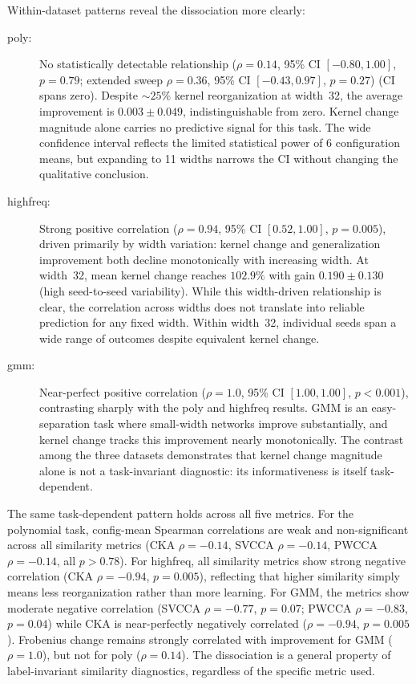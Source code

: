 \documentclass[twoside,11pt]{article}
\begin{document}
Within-dataset patterns reveal the dissociation more clearly:
\begin{description}
        \item[poly:] No statistically detectable relationship ($\rho=0.14$, 95\% CI ${[-0.80, 1.00]}$, $p=0.79$; extended sweep $\rho=0.36$, 95\% CI ${[-0.43, 0.97]}$, $p=0.27$) (CI spans zero).  Despite $\sim25\%$ kernel reorganization at width~32, the average improvement is $0.003\pm0.049$, indistinguishable from zero.  Kernel change magnitude alone carries no predictive signal for this task. The wide confidence interval reflects the limited statistical power of 6 configuration means, but expanding to 11 widths narrows the CI without changing the qualitative conclusion.
    \item[highfreq:] Strong positive correlation ($\rho=0.94$, 95\% CI ${[0.52, 1.00]}$, $p=0.005$), driven primarily by width variation: kernel change and generalization improvement both decline monotonically with increasing width.  At width~32, mean kernel change reaches $102.9\%$ with gain $0.190\pm0.130$ (high seed-to-seed variability).  While this width-driven relationship is clear, the correlation across widths does not translate into reliable prediction for any fixed width. Within width~32, individual seeds span a wide range of outcomes despite equivalent kernel change.
    \item[gmm:] Near-perfect positive correlation ($\rho=1.0$, 95\% CI ${[1.00, 1.00]}$, $p<0.001$), contrasting sharply with the poly and highfreq results.  GMM is an easy-separation task where small-width networks improve substantially, and kernel change tracks this improvement nearly monotonically.  The contrast among the three datasets demonstrates that kernel change magnitude alone is not a task-invariant diagnostic: its informativeness is itself task-dependent.

\end{description}

The same task-dependent pattern holds across all five metrics. For the polynomial task, config-mean Spearman correlations are weak and non-significant across all similarity metrics (CKA $\rho=-0.14$, SVCCA $\rho=-0.14$, PWCCA $\rho=-0.14$, all $p>0.78$). For highfreq, all similarity metrics show strong negative correlation (CKA $\rho=-0.94$, $p=0.005$), reflecting that higher similarity simply means less reorganization rather than more learning. For GMM, the metrics show moderate negative correlation (SVCCA $\rho=-0.77$, $p=0.07$; PWCCA $\rho=-0.83$, $p=0.04$) while CKA is near-perfectly negatively correlated ($\rho=-0.94$, $p=0.005$). Frobenius change remains strongly correlated with improvement for GMM ($\rho=1.0$), but not for poly ($\rho=0.14$). The dissociation is a general property of label-invariant similarity diagnostics, regardless of the specific metric used.
\end{document}
